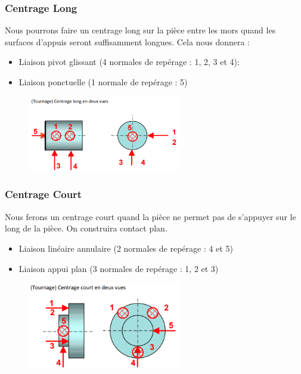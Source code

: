 \documentclass[
	11pt, %
	fleqn, %
	a4paper, %
]{LegrandOrangeBook}
\begin{document}
\subsubsection{Centrage Long}
Nous pourrons faire un centrage long sur la pièce entre les mors quand les surfaces d'appuis seront suffisamment longues. 
Cela nous donnera :
 \begin{itemize}
     \item Liaison pivot glissant (4 normales de repérage : 1, 2, 3 et 4):
     \item Liaison ponctuelle (1 normale de repérage : 5)
 \end{itemize}
 \begin{figure}[H] %
	\centering %
	\includegraphics[width=0.6\textwidth]{Images/C11.PNG} %

	\label{fig:placeholder} %
\end{figure}




\subsubsection{Centrage Court}
Nous ferons un centrage court quand la pièce ne permet pas de s'appuyer sur le long de la pièce. On construira contact plan.
\begin{itemize}
    \item Liaison linéaire annulaire (2 normales de repérage : 4 et 5)
    \item Liaison appui plan (3 normales de repérage : 1, 2 et 3)
\end{itemize}
 \begin{figure}[H] %
	\centering %
	\includegraphics[width=0.6\textwidth]{Images/C22.PNG} %

	\label{fig:placeholder} %
\end{figure}
\end{document}
